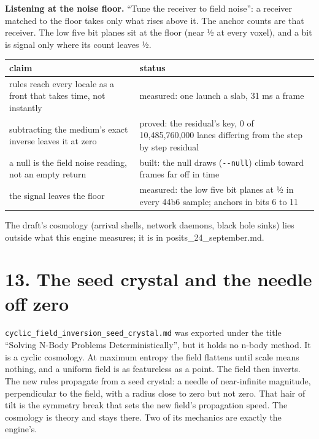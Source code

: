 \textbf{Listening at the noise floor.} “Tune the receiver to field noise”: a receiver matched to the floor takes only what rises above it. The anchor counts are that receiver. The low five bit planes sit at the floor (near ½ at every voxel), and a bit is signal only where its count leaves ½.

{\small
\setlength{\tabcolsep}{6pt}
\begin{longtable}{>{\RaggedRight\arraybackslash}p{}>{\RaggedRight\arraybackslash}p{}}
\toprule
claim & status \\
\midrule
\endhead
rules reach every locale as a front that takes time, not instantly & measured: one launch a slab, 31 ms a frame \\
subtracting the medium's exact inverse leaves it at zero & proved: the residual's key, 0 of 10,485,760,000 lanes differing from the step by step residual \\
a null is the field noise reading, not an empty return & built: the null draws (\texttt{-\allowbreak{}-\allowbreak{}null}) climb toward frames far off in time \\
the signal leaves the floor & measured: the low five bit planes at ½ in every 44b6 sample; anchors in bits 6 to 11 \\
\bottomrule
\end{longtable}
}

The draft's cosmology (arrival shells, network daemons, black hole sinks) lies outside what this engine measures; it is in posits\_\allowbreak{}24\_\allowbreak{}september.md.

\section{\texorpdfstring{13. The seed crystal and the needle off zero}{13. The seed crystal and the needle off zero}}

\texttt{cyclic\_\allowbreak{}field\_\allowbreak{}inversion\_\allowbreak{}seed\_\allowbreak{}crystal.\allowbreak{}md} was exported under the title “Solving N-Body Problems Deterministically”, but it holds no n-body method. It is a cyclic cosmology. At maximum entropy the field flattens until scale means nothing, and a uniform field is as featureless as a point. The field then inverts. The new rules propagate from a seed crystal: a needle of near-infinite magnitude, perpendicular to the field, with a radius close to zero but not zero. That hair of tilt is the symmetry break that sets the new field's propagation speed. The cosmology is theory and stays there. Two of its mechanics are exactly the engine's.

